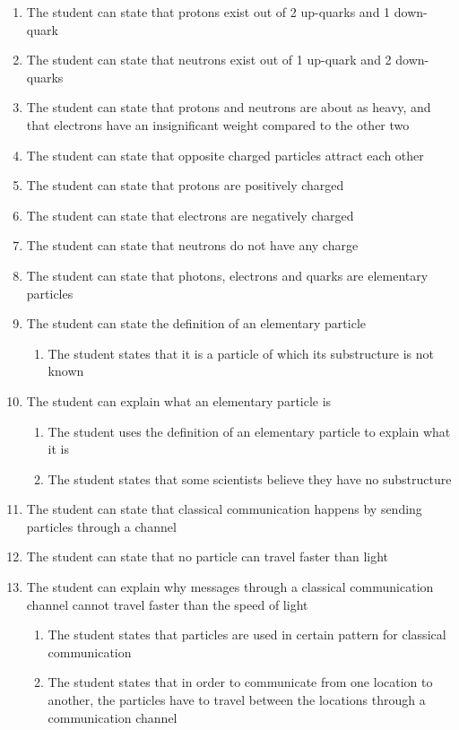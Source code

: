 \documentclass[11pt,twoside]{report} %
\begin{document}
\begin{enumerate}
\begin{enumerate}
\end{enumerate}
\item The student can state that protons exist out of 2 up-quarks and 1 down-quark
\item The student can state that neutrons exist out of 1 up-quark and 2 down-quarks
\item The student can state that protons and neutrons are about as heavy, and that electrons have an insignificant weight compared to the other two
\item The student can state that opposite charged particles attract each other
\item The student can state that protons are positively charged
\item The student can state that electrons are negatively charged
\item The student can state that neutrons do not have any charge
\item The student can state that photons, electrons and quarks are elementary particles
\item The student can state the definition of an elementary particle
\begin{enumerate}
\item The student states that it is a particle of which its substructure is not known
\end{enumerate}
\item The student can explain what an elementary particle is
\begin{enumerate}
\item The student uses the definition of an elementary particle to explain what it is
\item The student states that some scientists believe they have no substructure
\end{enumerate}
\item The student can state that classical communication happens by sending particles through a channel
\item The student can state that no particle can travel faster than light
\item The student can explain why messages through a classical communication channel cannot travel faster than the speed of light
\begin{enumerate}
\item The student states that particles are used in certain pattern for classical communication
\item The student states that in order to communicate from one location to another, the particles have to travel between the locations through a communication channel

\end{enumerate}
\end{enumerate}
\end{document}
